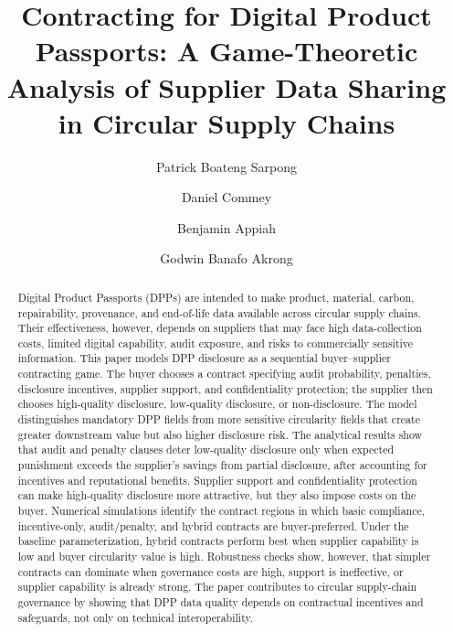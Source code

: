 \documentclass[final,5p,times,authoryear]{elsarticle}
\begin{document}
\begin{frontmatter}

\title{Contracting for Digital Product Passports: A Game-Theoretic Analysis of Supplier Data Sharing in Circular Supply Chains}

\author[inst1]{Patrick Boateng Sarpong}
\author[inst2]{Daniel Commey}
\author[inst3]{Benjamin Appiah}
\author[inst4]{Godwin Banafo Akrong}



\begin{abstract}
Digital Product Passports (DPPs) are intended to make product, material, carbon, repairability, provenance, and end-of-life data available across circular supply chains. Their effectiveness, however, depends on suppliers that may face high data-collection costs, limited digital capability, audit exposure, and risks to commercially sensitive information. This paper models DPP disclosure as a sequential buyer--supplier contracting game. The buyer chooses a contract specifying audit probability, penalties, disclosure incentives, supplier support, and confidentiality protection; the supplier then chooses high-quality disclosure, low-quality disclosure, or non-disclosure. The model distinguishes mandatory DPP fields from more sensitive circularity fields that create greater downstream value but also higher disclosure risk. The analytical results show that audit and penalty clauses deter low-quality disclosure only when expected punishment exceeds the supplier's savings from partial disclosure, after accounting for incentives and reputational benefits. Supplier support and confidentiality protection can make high-quality disclosure more attractive, but they also impose costs on the buyer. Numerical simulations identify the contract regions in which basic compliance, incentive-only, audit/penalty, and hybrid contracts are buyer-preferred. Under the baseline parameterization, hybrid contracts perform best when supplier capability is low and buyer circularity value is high. Robustness checks show, however, that simpler contracts can dominate when governance costs are high, support is ineffective, or supplier capability is already strong. The paper contributes to circular supply-chain governance by showing that DPP data quality depends on contractual incentives and safeguards, not only on technical interoperability.
\end{abstract}


\end{frontmatter}
\end{document}

